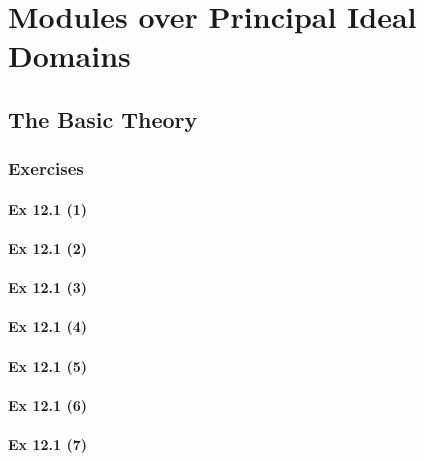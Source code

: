 \setcounter{chapter}{0}
\renewcommand{\thechapter}{12}
\chapter{Modules over Principal Ideal Domains}\label{ch:12}
\setcounter{equation}{0}	        %

\section{The  Basic Theory}\label{sec:12.1}	
\subsection*{Exercises}\label{sec:12.1_Exercises}

\subsubsection{Ex 12.1 (1)}\label{sec:Ex_12.1.1}

\subsubsection{Ex 12.1 (2)}\label{sec:Ex_12.1.2}

\subsubsection{Ex 12.1 (3)}\label{sec:Ex_12.1.3}

\subsubsection{Ex 12.1 (4)}\label{sec:Ex_12.1.4}

\subsubsection{Ex 12.1 (5)}\label{sec:Ex_12.1.5}

\subsubsection{Ex 12.1 (6)}\label{sec:Ex_12.1.6}

\subsubsection{Ex 12.1 (7)}\label{sec:Ex_12.1.7}


